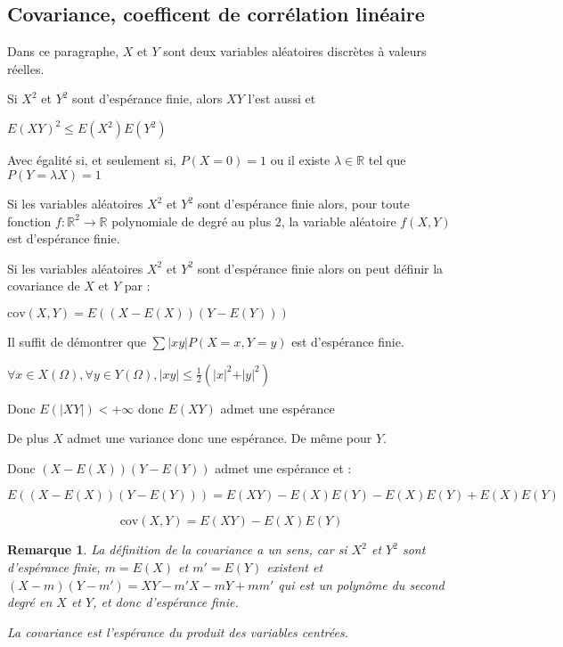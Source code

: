 \documentclass[a4paper,12pt]{book}
\newcommand{\Def}[2]{\begin{tcolorbox}[sharp corners, colback=white,colframe=blue!90!black!75, title=Définition : #1]#2\end{tcolorbox}}
\newcommand{\Prop}[2]{\begin{tcolorbox}[sharp corners, colback=white,colframe=red!90!black!75, title=Proposition : #1]#2\end{tcolorbox}}
\newcommand{\Pre}[1]{\begin{tcolorbox}[sharp corners, colback=white,colframe=green!60!green!30!black!75, title=Preuve]#1\end{tcolorbox}}
\newtheorem{Rem}{Remarque}[section]
\def\R{\mathbb{R}}
\begin{document}
\subsection{Covariance, coefficent de corrélation linéaire}
Dans ce paragraphe, $X$ et $Y$ sont deux variables aléatoires discrètes à valeurs réelles.
\Prop{Inégalité de Cauchy-Schwarz}{Si $X^2$ et $Y^2$ sont d'espérance finie, alors $XY$ l'est aussi et \par\begin{center}$E(XY)^2\leq E(X^2)E(Y^2)$\end{center}
\par Avec égalité si, et seulement si, $P(X=0)=1$ ou il existe $\lambda\in\R$ tel que $P(Y=\lambda X)=1$}
\Prop{}{Si les variables aléatoires $X^2$ et $Y^2$ sont d'espérance finie alors, pour toute fonction $f:\R^2\to \R$ polynomiale de degré au plus $2$, la variable aléatoire $f(X,Y)$ est d'espérance finie.}
\Def{}{Si les variables aléatoires $X^2$ et $Y^2$ sont d'espérance finie alors on peut définir la covariance de $X$ et $Y$ par :\par\begin{center}$\mathrm{cov}(X,Y)=E((X-E(X))(Y-E(Y)))$\end{center}}
\Pre{Il suffit de démontrer que $\sum\vert xy\vert P(X=x, Y=y)$ est d'espérance finie.
\par $\forall x\in X(\Omega), \forall y\in Y(\Omega), \vert xy\vert \leq\frac{1}{2}\left(\vert x\vert^2 + \vert y\vert^2\right)$
\par Donc $E(\vert XY\vert)<+\infty$ donc $E(XY)$ admet une espérance
\par De plus $X$ admet une variance donc une espérance. De même pour $Y$.
\par Donc $(X-E(X))(Y-E(Y))$ admet une espérance et :
\par $$ E((X-E(X))(Y-E(Y)))=E(XY)-E(X)E(Y)-E(X)E(Y)+ E(X)E(Y)$$
\par $$ \mathrm{cov}(X,Y)=E(XY) - E(X)E(Y)$$}
\begin{Rem}
La définition de la covariance a un sens, car si $X^2$ et $Y^2$ sont d'espérance finie, $m=E(X)$ et $m'=E(Y)$ existent et $(X-m)(Y-m')=XY-m'X-mY+mm'$ qui est un polynôme du second degré en $X$ et $Y$, et donc d'espérance finie.
\par La covariance est l'espérance du produit des variables centrées.
\end{Rem}
\end{document}
